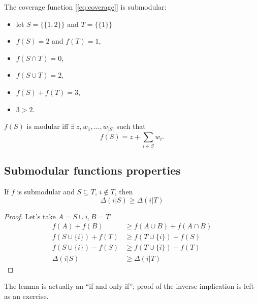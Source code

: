 \begin{ex}
    The coverage function [\ref{eq:coverage}] is submodular:
    \begin{itemize}
        \item let $S=\{\{1,2\}\}$ and $T = \{\{1\}\}$
        \item $f(S)=2$ and $f(T)=1$,
        \item $f(S \cap T) = 0$,
        \item $f(S \cup T) = 2$,
        \item $f(S) + f(T) = 3$,
        \item $3 > 2$.
    \end{itemize}    
\end{ex}

\begin{thm}\label{thm:modular}
    $f(S)$ is modular iff $\exists\ z, w_1, \ldots, w_{|S|}$ such that
    \begin{equation}
        f(S) = z + \sum_{i \in S} w_i.
    \end{equation}
\end{thm}

\subsection{Submodular functions properties}
\begin{lem} \label{lem:dim-return}
    If $f$ is submodular and $S \subseteq T$, $i \notin T$, then
    \[
        \Delta(i|S) \geq \Delta(i | T)
    \]
\end{lem}

\begin{proof}
    Let's take $A = S \cup {i}, B = T$
    \begin{align*}
        f(A) + f(B) &\geq f(A \cup B) + f(A \cap B) \tag{by submodularity}\\
        f(S \cup \{ i\} ) + f(T) &\geq f(T \cup \{ i\}) + f(S) \tag{by definition of A,B} \\
        f(S \cup \{ i \}) - f(S) &\geq f(T \cup \{i\}) - f(T) \\
        \Delta(i|S) &\geq \Delta(i | T) \tag{by definition of $\Delta$ }
    \end{align*}
\end{proof}

\begin{obs}
    The lemma is actually an ``if and only if''; proof of the inverse implication is left as an exercise.
\end{obs}

